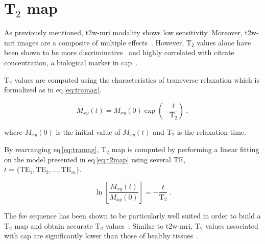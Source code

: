 \section{T$_2$ map} \label{subsec:chp2:imaging:t2}
As previously mentioned, \ac{t2w}-\ac{mri} modality shows low sensitivity.
Moreover, \ac{t2w}-\ac{mri} images are a composite of multiple effects~\cite{Hegde2013}.
However, T$_2$ values alone have been shown to be more discriminative~\cite{Liu2011} and highly correlated with citrate concentration, a biological marker in \ac{cap}~\cite{Liney1996,Liney1997}.

T$_2$ values are computed using the characteristics of transverse relaxation which is formalized as in \acs{eq}\,\eqref{eq:tramag}.

\begin{equation}
	M_{xy}(t) = M_{xy}(0) \exp \left( - \frac{t}{\text{T}_2} \right) \ ,
	\label{eq:tramag}
\end{equation}

\noindent where $M_{xy}(0)$ is the initial value of $M_{xy}(t)$ and T$_2$ is the relaxation time.

By rearranging \acs{eq}\,\eqref{eq:tramag}, T$_2$ map is computed by performing a linear fitting on the model presented in \acs{eq}\,\eqref{eq:t2map} using several TE, $t=\{ \text{TE}_1,\text{TE}_2, \dotsc ,\text{TE}_m \}$.

\begin{equation}
	\ln \left[ \frac{M_{xy}(t)}{M_{xy}(0)} \right] = - \frac{t}{\text{T}_2} \ .
	\label{eq:t2map}
\end{equation}

The \Ac{fse} sequence has been shown to be particularly well suited in order to build a T$_2$ map and obtain accurate T$_2$ values~\cite{Liney1996a}.
Similar to \ac{t2w}-\ac{mri}, T$_2$ values associated with \ac{cap} are significantly lower than those of healthy tissues~\cite{Liney1996,Gibbs2001}.

